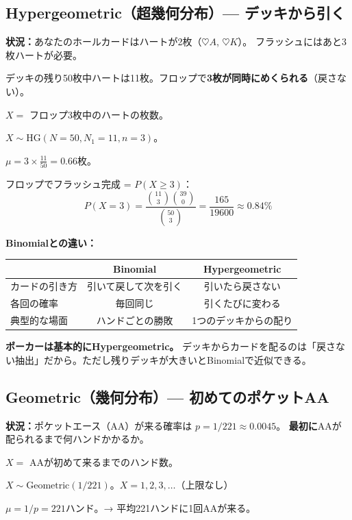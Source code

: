 \documentclass{article}
\theoremstyle{remark}
\begin{document}
\subsection{Hypergeometric（超幾何分布）--- デッキから引く}

\textbf{状況：}あなたのホールカードはハートが2枚（$\heartsuit A$, $\heartsuit K$）。
フラッシュにはあと3枚ハートが必要。

デッキの残り50枚中ハートは11枚。フロップで\textbf{3枚が同時にめくられる}（戻さない）。

$X = $ フロップ3枚中のハートの枚数。

$X \sim \text{HG}(N=50, N_1=11, n=3)$。

$\mu = 3 \times \frac{11}{50} = 0.66$枚。

フロップでフラッシュ完成 = $P(X \ge 3)$：
\[
  P(X = 3) = \frac{\binom{11}{3}\binom{39}{0}}{\binom{50}{3}} = \frac{165}{19600} \approx 0.84\%
\]

\textbf{Binomialとの違い：}
\begin{center}
  \begin{tabular}{lcc}
    \toprule
    & Binomial & Hypergeometric \\ \midrule
    カードの引き方 & 引いて戻して次を引く & 引いたら戻さない \\
    各回の確率 & 毎回同じ & 引くたびに変わる \\
    典型的な場面 & ハンドごとの勝敗 & 1つのデッキからの配り \\
    \bottomrule
  \end{tabular}
\end{center}

\textbf{ポーカーは基本的にHypergeometric。} デッキからカードを配るのは「戻さない抽出」だから。ただし残りデッキが大きいとBinomialで近似できる。

\subsection{Geometric（幾何分布）--- 初めてのポケットAA}

\textbf{状況：}ポケットエース（AA）が来る確率は $p = 1/221 \approx 0.0045$。
\textbf{最初に}AAが配られるまで何ハンドかかるか。

$X = $ AAが初めて来るまでのハンド数。

$X \sim \text{Geometric}(1/221)$。$X = 1, 2, 3, \ldots$（上限なし）

$\mu = 1/p = 221$ハンド。→ 平均221ハンドに1回AAが来る。
\end{document}
